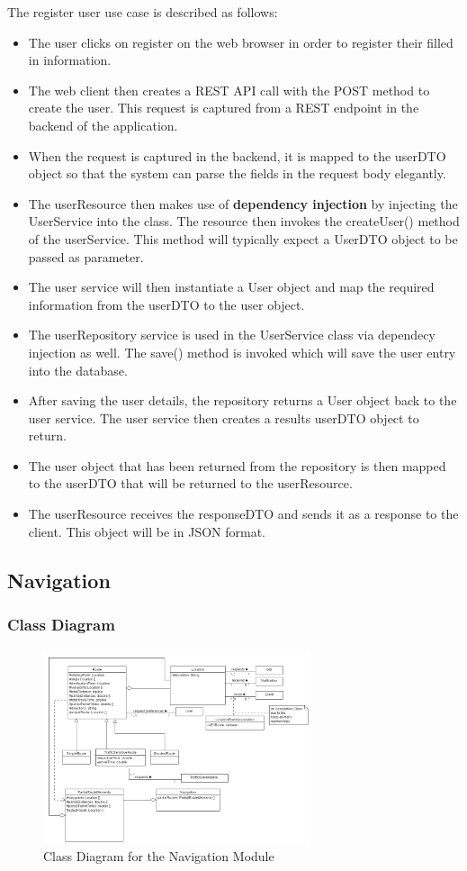 \documentclass[runningheads,a4paper]{article}
\begin{document}
	The register user use case is described as follows: 
	\begin{itemize}
		\item The user clicks on register on the web browser in order to register their filled in information. 
		\item The web client then creates a REST API call with the POST method to create the user. This request is captured from a REST endpoint in the backend of the application.
		\item When the request is captured in the backend, it is mapped to the userDTO object so that the system can parse the fields in the request body elegantly. 
		\item The userResource then makes use of \textbf{dependency injection} by injecting the UserService into the class. The resource then invokes the createUser() method of the userService. This method will typically expect a UserDTO object to be passed as parameter.
		\item The user service will then instantiate a User object and map the required information from the userDTO to the user object. 
		\item The userRepository service is used in the UserService class via dependecy injection as well. The save() method is invoked which will save the user entry into the database. 
		\item After saving the user details, the repository returns a User object back to the user service. The user service then creates a results userDTO object to return. 
		\item The user object that has been returned from the repository is then mapped to the userDTO that will be returned to the userResource. 
		\item The userResource receives the responseDTO and sends it as a response to the client. This object will be in JSON format. 
	\end{itemize}

\subsection{Navigation}
\subsubsection{Class Diagram}
\begin{figure}[H]
   	\centering
   	\includegraphics[width=0.7\textwidth]{Images/Diagrams/Navigation Module/Navigation-Module-Class-Diagram.png}
   	\caption{Class Diagram for the Navigation Module}
\end{figure}
\end{document}
